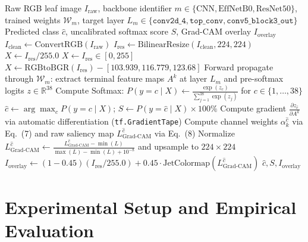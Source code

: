 \documentclass[journal]{IEEEtran}
\begin{document}
\begin{algorithm}[!t]
\caption{AgroVision Inference and Layer-Specific Grad-CAM Pipeline}
\label{alg:inference}
\begin{algorithmic}[1]
\REQUIRE Raw RGB leaf image $I_{\text{raw}}$, backbone identifier $m \in \{\text{CNN}, \text{EffNetB0}, \text{ResNet50}\}$, trained weights $\mathcal{W}_m$, target layer $L_m \in \{\texttt{conv2d\_4}, \texttt{top\_conv}, \texttt{conv5\_block3\_out}\}$
\ENSURE Predicted class $\hat{c}$, uncalibrated softmax score $S$, Grad-CAM overlay $I_{\text{overlay}}$
\STATE $I_{\text{clean}} \leftarrow \text{ConvertRGB}(I_{\text{raw}})$
\STATE $I_{\text{res}} \leftarrow \text{BilinearResize}(I_{\text{clean}}, 224, 224)$
    \STATE $X \leftarrow I_{\text{res}} / 255.0$ 
    \STATE $X \leftarrow I_{\text{res}} \in [0, 255]$ 
    \STATE $X \leftarrow \text{RGBtoBGR}(I_{\text{res}}) - [103.939, 116.779, 123.68]$ 
\ENDIF
\STATE Forward propagate through $\mathcal{W}_m$: extract terminal feature maps $A^k$ at layer $L_m$ and pre-softmax logits $z \in \mathbb{R}^{38}$
\STATE Compute Softmax: $P(y = c \mid X) \leftarrow \frac{\exp(z_c)}{\sum_{j=1}^{38} \exp(z_j)}$ for $c \in \{1,\dots,38\}$
\STATE $\hat{c} \leftarrow \arg\max_c P(y = c \mid X)$; \quad $S \leftarrow P(y = \hat{c} \mid X) \times 100\%$
\STATE Compute gradient $\frac{\partial z_{\hat{c}}}{\partial A^k}$ via automatic differentiation (\texttt{tf.GradientTape})
\STATE Compute channel weights $\alpha_k^{\hat{c}}$ via Eq.~(7) and raw saliency map $L_{\text{Grad-CAM}}^{\hat{c}}$ via Eq.~(8)
\STATE Normalize $L_{\text{Grad-CAM}}^{\hat{c}} \leftarrow \frac{L_{\text{Grad-CAM}}^{\hat{c}} - \min(L)}{\max(L) - \min(L) + 10^{-8}}$ and upsample to $224 \times 224$
\STATE $I_{\text{overlay}} \leftarrow (1 - 0.45) (I_{\text{res}}/255.0) + 0.45 \cdot \text{JetColormap}(L_{\text{Grad-CAM}}^{\hat{c}})$
\RETURN $\hat{c}, S, I_{\text{overlay}}$
\end{algorithmic}
\end{algorithm}

\section{Experimental Setup and Empirical Evaluation}
\end{document}
